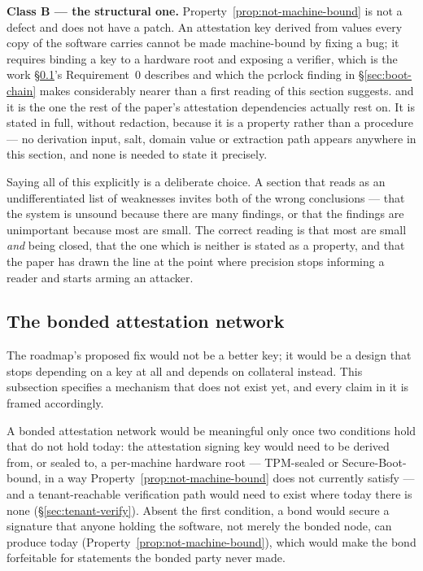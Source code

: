 \textbf{Class B --- the structural one.} Property~\ref{prop:not-machine-bound} is not a defect and
does not have a patch. An attestation key derived from values every copy of the software carries
cannot be made machine-bound by fixing a bug; it requires binding a key to a hardware root and
exposing a verifier, which is the work \S\ref{sec:bonded-network}'s Requirement~0 describes and
which the pcrlock finding in \S\ref{sec:boot-chain} makes considerably nearer than a first reading
of this section suggests.  and it
is the one the rest of the paper's attestation dependencies actually rest on. It is stated in full,
without redaction, because it is a property rather than a procedure --- no derivation input, salt,
domain value or extraction path appears anywhere in this section, and none is needed to state it
precisely.

Saying all of this explicitly is a deliberate choice. A section that reads as an undifferentiated
list of weaknesses invites both of the wrong conclusions --- that the system is unsound because
there are many findings, or that the findings are unimportant because most are small. The correct
reading is that most are small \emph{and} being closed, that the one which is neither is stated as
a property, and that the paper has drawn the line at the point where precision stops informing a
reader and starts arming an attacker.

\subsection{The bonded attestation network}
\label{sec:bonded-network}

The roadmap's proposed fix would not be a better key; it would be a design that stops depending on
a key at all and depends on collateral instead. This subsection specifies a mechanism that does not
exist yet, and every claim in it is framed accordingly.

\begin{assumption}[Requirement 0]
\label{asm:requirement-zero}
A bonded attestation network would be meaningful only once two conditions hold that do not hold
today: the attestation signing key would need to be derived from, or sealed to, a per-machine
hardware root — TPM-sealed or Secure-Boot-bound, in a way Property~\ref{prop:not-machine-bound}
does not currently satisfy — and a tenant-reachable verification path would need to exist where
today there is none (\S\ref{sec:tenant-verify}). Absent the first condition, a bond would secure a
signature that anyone holding the \fluxsas software, not merely the bonded node, can produce today
(Property~\ref{prop:not-machine-bound}), which would make the bond forfeitable for statements the
bonded party never made. 
\end{assumption}

